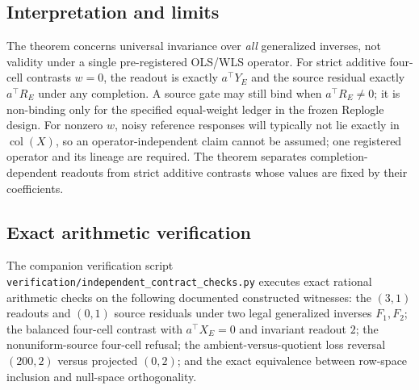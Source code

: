 \documentclass[11pt]{article}
\begin{document}
\subsection{Interpretation and limits}
The theorem concerns universal invariance over \emph{all} generalized inverses, not validity under a single pre-registered OLS/WLS operator. For strict additive four-cell contrasts $w=0$, the readout is exactly $a^\top Y_E$ and the source residual exactly $a^\top R_E$ under any completion. A source gate may still bind when $a^\top R_E\ne0$; it is non-binding only for the specified equal-weight ledger in the frozen Replogle design. For nonzero $w$, noisy reference responses will typically not lie exactly in $\operatorname{col}(X)$, so an operator-independent claim cannot be assumed; one registered operator and its lineage are required. The theorem separates completion-dependent readouts from strict additive contrasts whose values are fixed by their coefficients.

\subsection{Exact arithmetic verification}
The companion verification script \nolinkurl{verification/independent_contract_checks.py} executes exact rational arithmetic checks on the following documented constructed witnesses: the $(3,1)$ readouts and $(0,1)$ source residuals under two legal generalized inverses $F_1, F_2$; the balanced four-cell contrast with $a^\top X_E=0$ and invariant readout $2$; the nonuniform-source four-cell refusal; the ambient-versus-quotient loss reversal $(200,2)$ versus projected $(0,2)$; and the exact equivalence between row-space inclusion and null-space orthogonality.






\medskip
\renewcommand{\refname}{Supplementary references}
\begingroup\small{}\setlength{\bibsep}{0pt}


\endgroup
\end{document}
